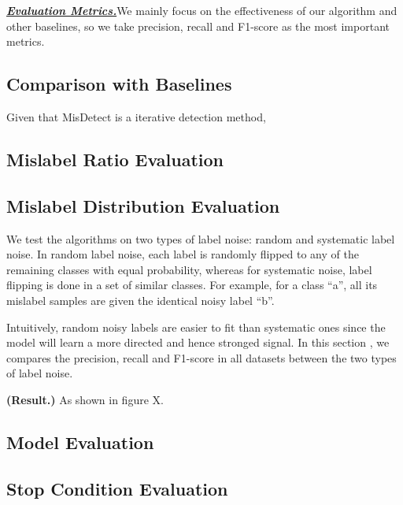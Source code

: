 \textbf{\textit{\underline{Evaluation Metrics.}}}We mainly focus on the effectiveness of our algorithm and other baselines, so we take precision, recall and F1-score as the most important metrics.

\subsection{Comparison with Baselines}

Given that MisDetect is a iterative detection method,

\subsection{Mislabel Ratio Evaluation}

\subsection{Mislabel Distribution Evaluation}

We test the algorithms on two types of label noise: random and systematic label noise. In random label noise, each label is randomly flipped to any of the remaining classes with equal probability, whereas for systematic noise, label flipping is done in a set of similar classes. For example, for a class “a”, all its mislabel samples are given the identical noisy label “b”.

Intuitively, random noisy labels are easier to fit than systematic ones since the model will learn a more directed and hence stronged signal. In this section , we compares the precision, recall and F1-score in all datasets between the two types of label noise.

\textbf{(Result.)} As shown in figure X.

\subsection{Model Evaluation}

\subsection{Stop Condition Evaluation}
